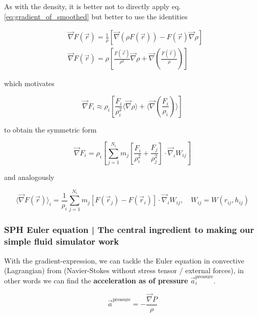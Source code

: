 As with the density, it is better not to directly apply eq. \ref{eq:gradient_of_smoothed} but better to use the identities

\begin{equation}
    \label{eq:gradient_identities}
    \begin{aligned}
    & \vec{\nabla} F(\vec{r})=\frac{1}{\rho}[\vec{\nabla} (\rho F(\vec{r}))-F(\vec{r}) \vec{\nabla} \rho] \\
    & \vec{\nabla} F(\vec{r})=\rho\left[\frac{F(\vec{r})}{\rho^2} \vec{\nabla} \rho + \vec{\nabla} \left(\frac{F(\vec{r})}{\rho}\right)\right]
    \end{aligned}
\end{equation}

which motivates

\begin{equation}
    \vec{\nabla} F_i \approx \rho_i \left[\frac{F_i}{\rho_i^2} \langle \vec{\nabla} \rho \rangle + \langle \vec{\nabla} \left(\frac{F_i}{\rho_i}\right) \rangle \right]
\end{equation}

to obtain the symmetric form

\begin{equation}
    \vec{\nabla} F_i =\rho_i\left[\sum_{j=1}^{N_i} m_j\left[\frac{F_i}{\rho_i^2}+\frac{F_j}{\rho_j^2}\right] \cdot \vec{\nabla}_i W_{i j}\right]
\end{equation}

and analogously

\begin{equation}
    \label{eq:gradient_1}
    \langle\vec{\nabla} F(\vec{r})\rangle_i=\frac{1}{\rho_i} \sum_{j=1}^{N_i} m_j\left[F\left(\vec{r}_j\right)-F\left(\vec{r}_i\right)\right] \cdot \vec{\nabla}_i W_{i j}, \quad W_{i j}=W\left(r_{i j}, h_{i j}\right)
\end{equation}

\subsubsection{SPH Euler equation | The central ingredient to making our simple fluid simulator work}

With the gradient-expression, we can tackle the Euler equation in convective (Lagrangian) from (Navier-Stokes without stress tensor / external forces),
in other words we can find the \textbf{acceleration as of pressure } $\vec{a}_i^{\text{pressure}}$.

\begin{equation}
    \vec{a}^{\text{pressure}} = -\frac{\vec{\nabla}P}{\rho}
\end{equation}

